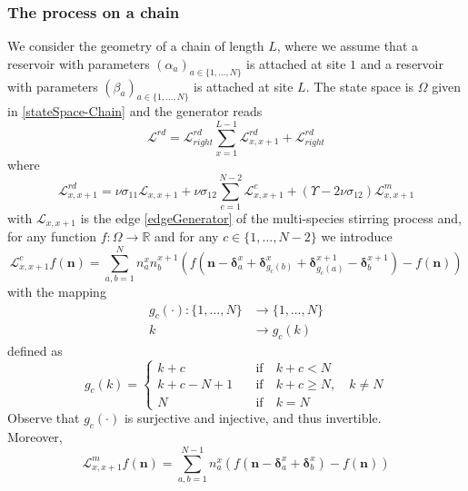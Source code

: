 \documentclass[10pt]{article}
\numberwithin{equation}{section}
\numberwithin{equation}{subsection}
\begin{document}
\subsubsection{The process on a chain}
We consider the geometry of a chain of length $L$, where we assume that a reservoir with parameters $(\alpha_{a})_{a\in\{1,\ldots,N\}}$ is attached at site $1$ and a reservoir with parameters $(\beta_{a})_{a\in\{1,\ldots,N\}}$ is attached at site $L$. The state space is $\Omega$ given in \eqref{stateSpace-Chain} and the generator reads
\begin{equation}\label{RDGenerator}
	\mathcal{L}^{rd}=\mathcal{L}_{right}^{rd}\sum_{x=1}^{L-1}\mathcal{L}_{x,x+1}^{rd}+\mathcal{L}_{right}^{rd}
\end{equation}
where
\begin{equation}\label{edgeGeneratorRD}
	\mathcal{L}_{x,x+1}^{rd}=\nu \sigma_{11}\mathcal{L}_{x,x+1}+\nu \sigma_{12}\sum_{c=1}^{N-2}\mathcal{L}_{x,x+1}^{c}+(\Upsilon-2\nu\sigma_{12})\mathcal{L}_{x,x+1}^{m}
\end{equation}
with $\mathcal{L}_{x,x+1}$ is the edge \eqref{edgeGenerator} of the multi-species stirring process and, for any function $f:\Omega\to \mathbb{R}$ and for any $c\in \{1,\ldots,N-2\}$ we introduce
\begin{equation}
	\mathcal{L}_{x,x+1}^{c}f(\bm{n})=\sum_{a,b=1}^{N}n_{a}^{x}n_{b}^{x+1}\left(f(\bm{n}-\bm{\delta}_{a}^{x}+\bm{\delta}_{g_{c}(b)}^{x}+\bm{\delta}_{g_{c}(a)}^{x+1}-\bm{\delta}_{b}^{x+1})-f(\bm{n})\right)
\end{equation}
with the mapping 
\begin{equation}
	\begin{split}
		g_{c}(\cdot):\{1,\ldots,N\}&\to\{1,\ldots,N\}\\
		k&\to g_{c}(k)
	\end{split}
\end{equation}
defined as
\begin{equation}
	g_{c}(k)=\begin{cases}
		k+c \quad &\text{if}\quad k+c< N \\
		k+c-N+1\quad &\text{if}\quad k+c\geq N,\quad k\neq N\\
		N\quad &\text{if}\quad k=N
	\end{cases}
\end{equation}
Observe that $g_{c}(\cdot)$ is surjective and injective, and thus invertible. \\
Moreover,
\begin{equation}
	\mathcal{L}_{x,x+1}^{m}f(\bm{n})=\sum_{a,b=1}^{N-1}n_{a}^{x}\left(f(\bm{n}-\bm{\delta}_{a}^{x}+\bm{\delta}_{b}^{x})-f(\bm{n})\right)
\end{equation}
\end{document}

